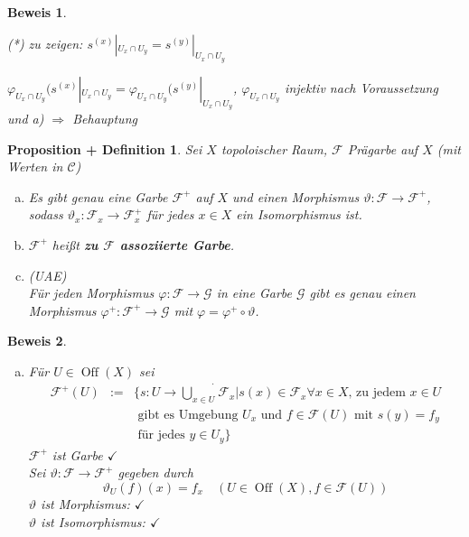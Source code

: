 \documentclass[a4paper, 12pt, numbers=noendperiod, chapterprefix=true]{scrbook}
\theoremstyle{break}
\newtheorem{PropDef}[Def]{Proposition + Definition}
\theoremstyle{nonumberbreak}
\newtheorem{bew}{Beweis}
\theoremstyle{nonumberplain}
\newcommand{\quot}[1]{\textrm{\glqq}{#1}\textrm{\grqq}}
\newcommand{\emp}[1]{\textbf{\emph{#1}}}
\newcommand{\deftermspec}[2]{{\index{#2}}\emp{#1}}
\newenvironment{twosidedproof}{\begin{enumerate}[\quot{$\Rightarrow$}:]}{\end{enumerate}}
\DeclareMathOperator{\Off}{Off}
\newcommand{\calF}{\mathcal{F}}
\newcommand{\calG}{\mathcal{G}}
\newcommand{\calC}{\mathcal{C}}
\begin{document}
\begin{bew}
\begin{enumerate}[a)]
\begin{twosidedproof}
    (*) zu zeigen: $s^{(x)}|_{U_x\cap U_y} = s^{(y)}|_{U_x\cap U_y}$\begin{description}[\setlabelstyle{\itshape}]
    \item[denn:] $\varphi_{U_x\cap U_y}(s^{(x)}|_{U_x\cap U_y} = \varphi_{U_x\cap U_y}(s^{(y)}|_{U_x\cap U_y}$, $\varphi_{U_x\cap U_y}$ injektiv nach Voraussetzung und a) $\Rightarrow $ Behauptung
    \end{description}
  \end{twosidedproof}
\end{enumerate}\end{bew}

\begin{PropDef}
Sei $X$ topoloischer Raum, $\calF$ Pr\"agarbe auf $X$ (mit Werten in $\calC$)
\begin{enumerate}[a)]
\item
  Es gibt genau eine Garbe $\calF^+$ auf $X$ und einen Morphismus $\vartheta: \calF \to \calF^+$, sodass $\vartheta_x:\calF_x \to \calF_x^+$ f\"ur jedes $x\in X$ ein Isomorphismus ist.
\item
  $\calF^+$ hei\ss t \deftermspec{zu $\calF$ assoziierte Garbe}{Garbe!assoziierte}.
\item(UAE)\\
  F\"ur jeden Morphismus $\varphi: \calF \to \calG$ in eine Garbe $\calG$ gibt es genau einen Morphismus $\varphi^+: \calF^+ \to \calG$ mit $\varphi = \varphi^+ \circ \vartheta$.
  \begin{center}\end{center}
\end{enumerate}\end{PropDef}

\begin{bew}\begin{enumerate}[a)]\item
F\"ur $U\in \Off(X)$ sei
  \[\begin{array}{rcl}\calF^+(U) &:=& \{s: U\to \dot{\bigcup\limits_{x\in U}}\calF_x | s(x)\in \calF_x \forall x\in X \text{, zu jedem } x\in U \\ &&\text{ gibt es Umgebung } U_x \text{ und } f\in \calF(U) \text{ mit } s(y) = f_y \\&& \text{ f\"ur jedes } y \in U_y\}\end{array}\]
$\calF^+$ ist Garbe $\checkmark$\\
Sei $\vartheta: \calF \to \calF^+$ gegeben durch
  \[\boxed{\vartheta_U(f)(x) = f_x \quad (U\in \Off(X), f\in \calF(U))}\]
$\vartheta$ ist Morphismus: $\checkmark$\\
$\vartheta$ ist Isomorphismus: $\checkmark$
\end{enumerate}\end{bew}
\end{document}
